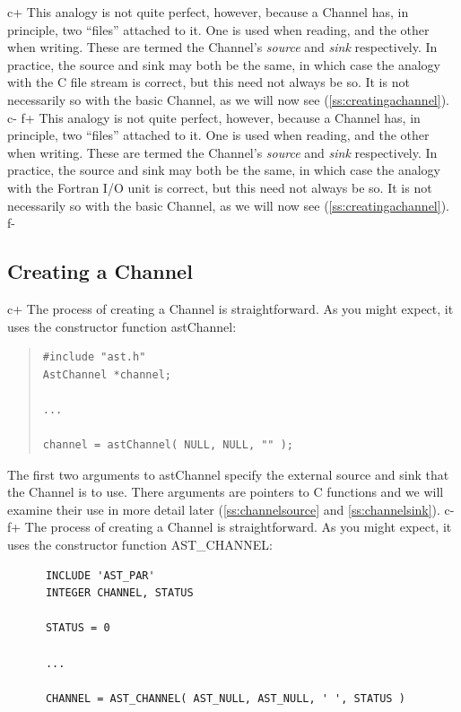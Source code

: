 \documentclass[twoside,11pt]{article}
\newcommand{\secref}[1]{\S\ref{#1}}
\renewcommand{\secref}[1]{\ref{#1}}
\begin{document}
c+
This analogy is not quite perfect, however, because a Channel has, in
principle, two ``files'' attached to it. One is used when reading, and
the other when writing. These are termed the Channel's {\em{source}}
and {\em{sink}} respectively. In practice, the source and sink may
both be the same, in which case the analogy with the C file stream is
correct, but this need not always be so. It is not necessarily so with
the basic Channel, as we will now see (\secref{ss:creatingachannel}).
c-
f+
This analogy is not quite perfect, however, because a Channel has, in
principle, two ``files'' attached to it. One is used when reading, and
the other when writing. These are termed the Channel's {\em{source}}
and {\em{sink}} respectively. In practice, the source and sink may
both be the same, in which case the analogy with the Fortran I/O unit
is correct, but this need not always be so. It is not necessarily so
with the basic Channel, as we will now see
(\secref{ss:creatingachannel}).
f-

\subsection{\label{ss:creatingachannel}Creating a Channel}

c+
The process of creating a Channel is straightforward. As you
might expect, it uses the constructor function astChannel:

\begin{quote}
\small
\begin{verbatim}
#include "ast.h"
AstChannel *channel;

...

channel = astChannel( NULL, NULL, "" );
\end{verbatim}
\normalsize
\end{quote}

The first two arguments to astChannel specify the external source and
sink that the Channel is to use. There arguments are pointers to C
functions and we will examine their use in more detail later
(\secref{ss:channelsource} and \secref{ss:channelsink}).
c-
f+
The process of creating a Channel is straightforward. As you
might expect, it uses the constructor function AST\_CHANNEL:

\small
\begin{verbatim}
      INCLUDE 'AST_PAR'
      INTEGER CHANNEL, STATUS

      STATUS = 0

      ...

      CHANNEL = AST_CHANNEL( AST_NULL, AST_NULL, ' ', STATUS )
\end{verbatim}
\normalsize
\end{document}
